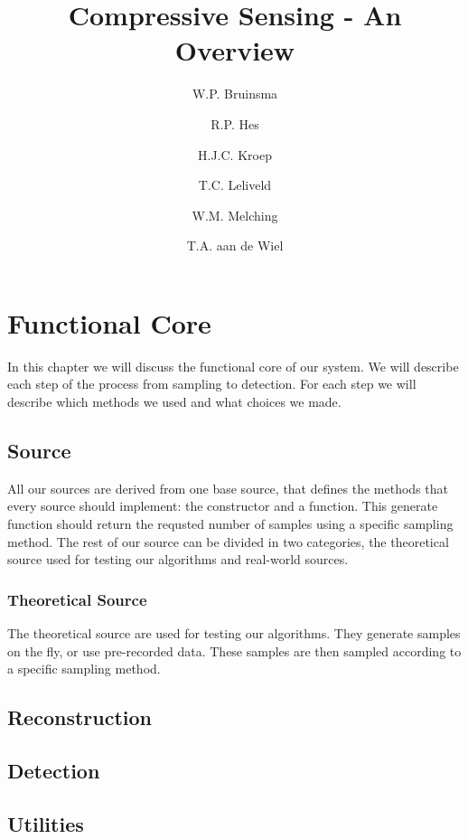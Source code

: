 \documentclass[a4paper, openany, oneside]{memoir}
\title{Compressive Sensing - An Overview}
\author{W.P. Bruinsma \and R.P. Hes \and H.J.C. Kroep \and T.C. Leliveld \and W.M. Melching \and T.A. aan de Wiel}
\begin{document}
\chapter{Functional Core}
In this chapter we will discuss the functional core of our system. We will describe each step of the process from sampling to detection. For each step we will describe which methods we used and what choices we made.

\section{Source}
\label{sec:source}
All our sources are derived from one base source, that defines the methods that every source should implement: the constructor and a  function. This generate function should return the requsted number of samples using a specific sampling method. The rest of our source can be divided in two categories, the theoretical source used for testing our algorithms and real-world sources.

\subsection{Theoretical Source}
\label{sec:theoretical-source}
The theoretical source are used for testing our algorithms. They generate samples on the fly, or use pre-recorded data. These samples are then sampled according to a specific sampling method.




\section{Reconstruction}
\label{sec:reconstruction}

\section{Detection}
\label{sec:detection}

\section{Utilities}
\label{sec:utilities}
\end{document}
